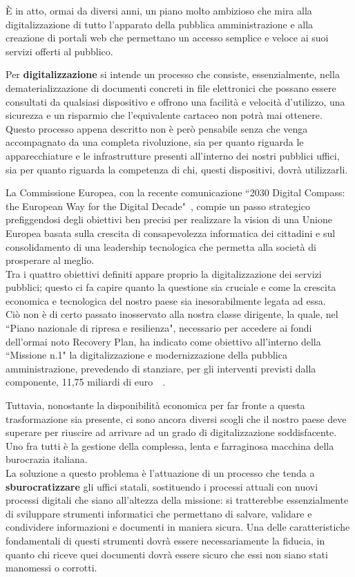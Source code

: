 È in atto, ormai da diversi anni, un piano molto ambizioso che mira alla digitalizzazione
di tutto l'apparato della pubblica amministrazione e alla creazione di portali web che
permettano un accesso semplice e veloce ai suoi servizi offerti al pubblico.

Per \textbf{digitalizzazione} si intende un processo che consiste, essenzialmente,
nella dematerializzazione di documenti concreti in file elettronici che possano essere
consultati da qualsiasi dispositivo e offrono una facilità e velocità d'utilizzo,
una sicurezza e un risparmio che l'equivalente cartaceo non potrà mai ottenere.
\\
Questo processo appena descritto non è però pensabile senza che venga accompagnato
da una completa rivoluzione, sia per quanto riguarda le apparecchiature e le
infrastrutture presenti all'interno dei nostri pubblici uffici, sia per quanto
riguarda la competenza di chi, questi dispositivi, dovrà utilizzarli.

La Commissione Europea, con la recente comunicazione
``2030 Digital Compass: the European Way for the Digital Decade"~\cite{intro-1},
compie un passo strategico  prefiggendosi degli obiettivi ben precisi per realizzare
la vision di una Unione Europea basata sulla crescita di consapevolezza informatica
dei cittadini e sul consolidamento di una leadership tecnologica che permetta
alla società di prosperare al meglio.
\\
Tra i quattro obiettivi definiti appare proprio la digitalizzazione dei servizi pubblici;
questo ci fa capire quanto la questione sia cruciale e come la crescita economica
e tecnologica del nostro paese sia inesorabilmente legata ad essa.
\\
Ciò non è di certo passato inosservato alla nostra classe dirigente,
la quale, nel ``Piano nazionale di ripresa e resilienza", necessario per accedere ai fondi
dell'ormai noto Recovery Plan, ha indicato come obiettivo all'interno della ``Missione n.1"
la digitalizzazione e modernizzazione della pubblica amministrazione, prevedendo di stanziare,
per gli interventi previsti dalla componente, 11,75 miliardi di euro~\cite{intro-2}~\cite{intro-3}.

Tuttavia, nonostante la disponibilità economica per far fronte a questa trasformazione
sia presente, ci sono ancora diversi scogli che il nostro paese deve superare per riuscire
ad arrivare ad un grado di digitalizzazione soddisfacente. Uno fra tutti è la gestione
della complessa, lenta e farraginosa macchina della burocrazia italiana.
\\
La soluzione a questo problema è l'attuazione di un processo che tenda a \textbf{sburocratizzare}
gli uffici statali, sostituendo i processi attuali con nuovi processi digitali che siano
all'altezza della missione: si tratterebbe essenzialmente di sviluppare strumenti informatici
che permettano di salvare, validare e condividere informazioni e documenti in maniera sicura.
Una delle caratteristiche fondamentali di questi strumenti dovrà essere necessariamente la
fiducia, in quanto chi riceve quei documenti dovrà essere sicuro che essi non siano stati
manomessi o corrotti.

